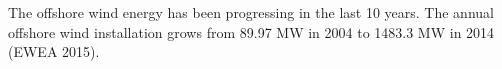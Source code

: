 \begin{introduction}

The offshore wind energy has been progressing in the last 10 years. The annual offshore wind installation grows from 89.97 MW in 2004 to 1483.3 MW in 2014 (EWEA 2015). 

\end{introduction}

